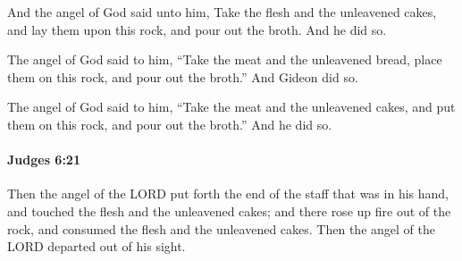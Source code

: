 			\begin{versebox}
					\item[BHS] 
					\item[ASV] And the angel of God said unto him, Take the flesh and the unleavened cakes, and lay them upon this rock, and pour out the broth. And he did so.
					\item[NIV] The angel of God said to him, “Take the meat and the unleavened bread, place them on this rock, and pour out the broth.” And Gideon did so.
					\item[NRSV] The angel of God said to him, “Take the meat and the unleavened cakes, and put them on this rock, and pour out the broth.” And he did so.
			\end{versebox}

		\paragraph{Judges 6:21} %
			\label{JUDGES-6-21}

			Then the angel of the LORD put forth the end of the staff that was in his hand, and touched the flesh and the unleavened cakes; and there rose up fire out of the rock, and consumed the flesh and the unleavened cakes. Then the angel of the LORD departed out of his sight.

